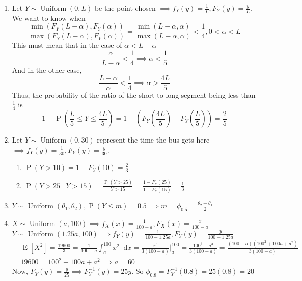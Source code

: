 \documentclass{article}
\newcommand{\pr}[1]{\operatorname{P}\left(#1\right)}
\newcommand{\expt}[1]{\operatorname{E}[#1]}
\newcommand{\unidist}[3]{#1 \sim \operatorname{Uniform}(#2, #3)}
\newcommand*\diff{\mathop{}\!\mathrm{d}}
\newcommand{\intv}[4]{\int_{#3}^{#4} #1 \diff #2}
\begin{document}
\begin{enumerate}
  \item Let $\unidist{Y}{0}{L}$ be the point chosen $\implies f_Y(y) = \frac{1}{L}, F_Y(y) = \frac{y}{L}$.\\
  We want to know when \[
    \frac{\min(F_Y(L - \alpha), F_Y(\alpha))}{\max(F_Y(L - \alpha), F_Y(\alpha))} 
    = \frac{\min(L - \alpha, \alpha)}{\max(L - \alpha, \alpha)} < \frac{1}{4}, 0 < \alpha < L
  \]
  This must mean that in the case of $\alpha < L - \alpha$\[
    \frac{\alpha}{L - \alpha} < \frac{1}{4} \implies \alpha < \frac{1}{5}
  \]
  And in the other case, \[
    \frac{L - \alpha}{\alpha} < \frac{1}{4} \implies \alpha > \frac{4L}{5}
  \]
  Thus, the probability of the ratio of the short to long segment 
  being less than $\frac{1}{4}$ is
  \[
    1 - \pr{\frac{L}{5} \leq  Y \leq \frac{4L}{5}} 
    = 1 - \left(F_Y\left(\frac{4L}{5}\right) - F_Y\left(\frac{L}{5}\right)\right) = \frac{2}{5}
  \]
  \item Let $\unidist{Y}{0}{30}$ represent the time the bus gets here
  $\implies f_Y(y) = \frac{1}{30}, F_Y(y) = \frac{y}{30}$.
  \begin{enumerate}
    \item $\pr{Y > 10} = 1 - F_Y(10) = \frac{2}{3}$
    \item $\pr{Y > 25 \mid Y > 15} = \frac{\pr{Y > 25}}{Y > 15} = \frac{1 - F_Y(25)}{1 - F_Y(15)} = \frac{1}{3}$
  \end{enumerate}

  \item $\unidist{Y}{\theta_1}{\theta_2}, \pr{Y \leq m} = 0.5
  \implies m = \phi_{0.5} = \frac{\theta_2 + \theta_1}{2}$

  \item $\unidist{X}{a}{100} \implies f_X(x) = \frac{1}{100-a}, F_X(x) = \frac{x}{100-a}$\\
  $\unidist{Y}{1.25a}{100} \implies f_Y(y) = \frac{1}{100-1.25a}, F_Y(y) = \frac{y}{100-1.25a}$
  \begin{align*}
    & \expt{X^2} = \frac{19600}{3} = 
    \frac{1}{100-a}\intv{x^2}{x}{a}{100} = 
    \frac{x^3}{3(100-a)}\bigg\rvert_a^{100} = 
    \frac{100^3-a^3}{3(100-a)} = \frac{(100-a)(100^2+100a+a^2)}{3(100-a)}\\
    & 19600 = 100^2+100a+a^2 \implies a = 60
  \end{align*}
  Now, $F_Y(y) = \frac{y}{25} \implies F^{-1}_Y(y) = 25y$.
  So $\phi_{0.8} = F^{-1}_Y(0.8) = 25(0.8) = 20$
\end{enumerate}
\end{document}
